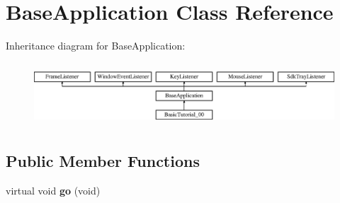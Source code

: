 \hypertarget{class_base_application}{}\section{Base\+Application Class Reference}
\label{class_base_application}
Inheritance diagram for Base\+Application\+:\begin{figure}[H]
\begin{center}
\leavevmode
\includegraphics[height=2.382979cm]{class_base_application}
\end{center}
\end{figure}
\subsection*{Public Member Functions}
\begin{DoxyCompactItemize}
\item 
\mbox{\label{class_base_application_a8a14a65a29118dd75173aa68678a05e1}} 
virtual void {\bfseries go} (void)
\end{DoxyCompactItemize}
